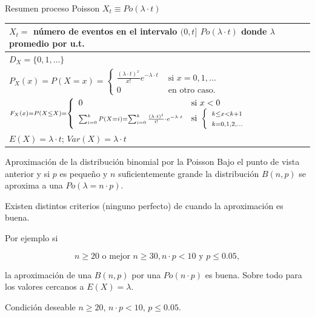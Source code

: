 \documentclass[
  ignorenonframetext,
  aspectratio=169]{beamer}
\begin{document}
\begin{frame}{Resumen proceso Poisson \(X_t\equiv Po(\lambda\cdot t)\)}
\protect\hypertarget{resumen-proceso-poisson-x_tequiv-polambdacdot-t}{}
\renewcommand{\arraystretch}{1.75}
\begin{table}
\centering
\begin{tabular}{|l|}
\hline\rowcolor{LightBlue}
$X_t=$ número de eventos en el intervalo $(0,t]$  $Po(\lambda\cdot t)$  donde  $\lambda$ promedio por u.t. 
\\\hline
$D_X=\{0,1,\ldots \}$ \\\hline
$P_X(x)=P(X=x)=\left\{\begin{array}{ll}  \frac{(\lambda\cdot t)^x}{x!}e^{-\lambda\cdot t} & \mbox{ si } x=0,1,\ldots\\ 0  & \mbox{ en otro caso.}\end{array}\right.$\\\hline
$\scriptstyle F_X(x)=P(X\leq X)=\left\{\begin{array}{ll} 0 & \mbox{si } x<0\\\displaystyle\scriptstyle\sum_{i=0}^{k} P(X=i)= \displaystyle\scriptstyle\sum_{i=0}^{k} \frac{(\lambda\cdot t)^i}{i!}\cdot e^{-\lambda\cdot t} & \mbox{si  }\left\{\begin{array}{l}\scriptstyle k\leq x< k+1\\\scriptstyle k=0,1,2,\ldots\end{array}\right.\end{array}\right.$

   \\\hline
$E(X)=\lambda\cdot t$; $Var(X)=\lambda\cdot t$\\\hline
\end{tabular}
\end{table}
\end{frame}

\begin{frame}{Aproximación de la distribución binomial por la Poisson}
\protect\hypertarget{aproximaciuxf3n-de-la-distribuciuxf3n-binomial-por-la-poisson}{}
Bajo el punto de vista anterior y si \(p\) es pequeño y \(n\)
suficientemente grande la distribución \(B(n,p)\) se aproxima a una
\(Po(\lambda=n\cdot p)\).

Existen distintos criterios (ninguno perfecto) de cuando la aproximación
es buena.

Por ejemplo si

\[n\geq 20\mbox{ o mejor }n\geq 30, n\cdot p < 10 \mbox{ y } p\leq 0.05,\]

la aproximación de una \(B(n,p)\) por una \(Po(n\cdot p)\) es buena.
Sobre todo para los valores cercanos a \(E(X)=\lambda\).

Condición deseable \(n\geq 20\), \(n\cdot p < 10\), \(p\leq 0.05\).
\end{frame}
\end{document}

